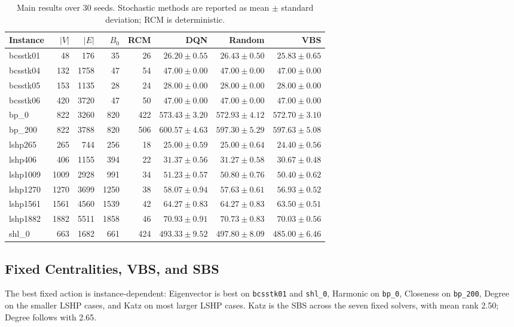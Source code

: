 \documentclass[runningheads]{llncs}
\begin{document}
\begin{table}[t]
\centering
\caption{Main results over 30 seeds. Stochastic methods are reported as mean $\pm$ standard deviation; RCM is deterministic.}
\label{tab:mainresults}
\scriptsize
\begin{tabular}{lrrrrrrr}
\toprule
Instance & $|V|$ & $|E|$ & $B_0$ & RCM & DQN & Random & VBS\\
\midrule
bcsstk01 & 48 & 176 & 35 & 26 & $26.20\pm0.55$ & $26.43\pm0.50$ & $\mathbf{25.83\pm0.65}$\\
bcsstk04 & 132 & 1758 & 47 & 54 & $47.00\pm0.00$ & $47.00\pm0.00$ & $47.00\pm0.00$\\
bcsstk05 & 153 & 1135 & 28 & 24 & $28.00\pm0.00$ & $28.00\pm0.00$ & $28.00\pm0.00$\\
bcsstk06 & 420 & 3720 & 47 & 50 & $47.00\pm0.00$ & $47.00\pm0.00$ & $47.00\pm0.00$\\
bp\_0 & 822 & 3260 & 820 & 422 & $573.43\pm3.20$ & $572.93\pm4.12$ & $\mathbf{572.70\pm3.10}$\\
bp\_200 & 822 & 3788 & 820 & 506 & $600.57\pm4.63$ & $597.30\pm5.29$ & $\mathbf{597.63\pm5.08}$\\
lshp265 & 265 & 744 & 256 & 18 & $25.00\pm0.59$ & $25.00\pm0.64$ & $\mathbf{24.40\pm0.56}$\\
lshp406 & 406 & 1155 & 394 & 22 & $31.37\pm0.56$ & $31.27\pm0.58$ & $\mathbf{30.67\pm0.48}$\\
lshp1009 & 1009 & 2928 & 991 & 34 & $51.23\pm0.57$ & $50.80\pm0.76$ & $\mathbf{50.40\pm0.62}$\\
lshp1270 & 1270 & 3699 & 1250 & 38 & $58.07\pm0.94$ & $57.63\pm0.61$ & $\mathbf{56.93\pm0.52}$\\
lshp1561 & 1561 & 4560 & 1539 & 42 & $64.27\pm0.83$ & $64.27\pm0.83$ & $\mathbf{63.50\pm0.51}$\\
lshp1882 & 1882 & 5511 & 1858 & 46 & $70.93\pm0.91$ & $70.73\pm0.83$ & $\mathbf{70.03\pm0.56}$\\
shl\_0 & 663 & 1682 & 661 & 424 & $493.33\pm9.52$ & $497.80\pm8.09$ & $\mathbf{485.00\pm6.46}$\\
\bottomrule
\end{tabular}
\end{table}

\subsection{Fixed Centralities, VBS, and SBS}

The best fixed action is instance-dependent: Eigenvector is best on \texttt{bcsstk01} and \texttt{shl\_0}, Harmonic on \texttt{bp\_0}, Closeness on \texttt{bp\_200}, Degree on the smaller LSHP cases, and Katz on most larger LSHP cases. Katz is the SBS across the seven fixed solvers, with mean rank 2.50; Degree follows with 2.65.
\end{document}
